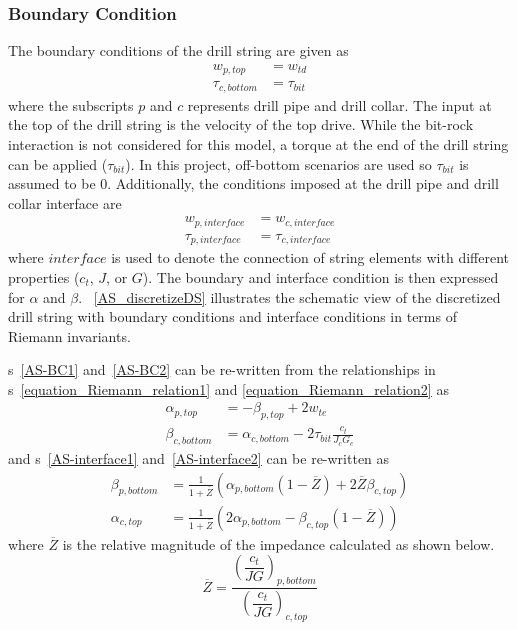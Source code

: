 \subsubsection{Boundary Condition}
The boundary conditions of the drill string are given as
\begin{align}
  w_{p,top} &= w_{td} \label{AS-BC1} \\
  \tau_{c,bottom} &= \tau_{bit} \label{AS-BC2}
\end{align}
where the subscripts $p$ and $c$ represents drill pipe and drill collar.  The input at the top of the drill string is the velocity of the top drive.  While the bit-rock interaction is not considered for this model, a torque at the end of the drill string can be applied ($\tau_{bit}$). In this project, off-bottom scenarios are used so $\tau_{bit}$ is assumed to be 0. Additionally, the conditions imposed at the drill pipe and drill collar interface are
\begin{align}
  w_{p,interface} &= w_{c,interface} \label{AS-interface1} \\
  \tau_{p,interface} &= \tau_{c,interface} \label{AS-interface2}
\end{align}
where $interface$ is used to denote the connection of string elements with different properties ($c_t$, $J$, or $G$). The boundary and interface condition is then expressed for $\alpha$ and $\beta$. \figurename~\ref{AS_discretizeDS} illustrates the schematic view of the discretized drill string with boundary conditions and interface conditions in terms of Riemann invariants.

\equationname{}s~\ref{AS-BC1} and~\ref{AS-BC2} can be re-written from the relationships in \equationname{}s~\ref{equation_Riemann_relation1} and \ref{equation_Riemann_relation2} as
\begin{align}
  \alpha_{p,top} &= -\beta_{p,top} + 2w_{te} \label{AS-riemannBC1} \\
  \beta_{c,bottom} &= \alpha_{c,bottom} - 2\tau_{bit} \frac{c_t}{J_c G_c} \label{AS-riemannBC2}
\end{align}
and \equationname{}s~\ref{AS-interface1} and~\ref{AS-interface2} can be re-written as
\begin{align}\label{AS-riemanninterface}
	\beta_{p,bottom} &= \frac{1}{1+\overline{Z}}\left(\alpha_{p,bottom}(1-\overline{Z}) + 2\overline{Z}\beta_{c,top} \right) \\
	\alpha_{c,top} &= \frac{1}{1+\overline{Z}}\left(2\alpha_{p,bottom} - \beta_{c,top}(1-\overline{Z})\right)
\end{align}
where $\overline{Z}$ is the relative magnitude of the impedance calculated as shown below.
\begin{equation}\label{AS_Zbar}
	\overline{Z} = \dfrac{\left(\dfrac{c_t}{JG}\right)_{p,bottom}}{\left(\dfrac{c_t}{JG}\right)_{c,top}}
\end{equation}

